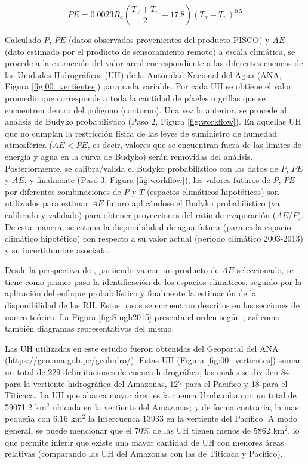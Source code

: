 \documentclass[12pt]{article}
\begin{document}
\begin{equation}
PE = 0.0023R_{a}\left ( \frac{T_{x}+T_{n}}{2} + 17.8 \right )\left ( T_{x}-T_{n} \right )^{0.5}
\end{equation}

Calculado $P$, $PE$ (datos observados provenientes del producto PISCO) y $AE$ (dato estimado por el producto de sensoramiento remoto) a escala climática, se procede a la extracción del valor areal correspondiente a las diferentes cuencas de las Unidades Hidrográficas (UH) de la Autoridad Nacional del Agua (ANA, Figura \ref{fig:00_vertientes}) para cada variable. Por cada UH se obtiene el valor promedio que corresponde a toda la cantidad de píxeles o grillas que se encuentren dentro del polígono (contorno). Una vez lo anterior, se procede al análisis de Budyko probabilístico (Paso 2, Figura \ref{fig:workflow}). En aquellas UH que no cumplan la restricción física de las leyes de suministro de humedad atmosférica ($AE < PE$, es decir, valores que se encuentran fuera de las límites de energía y agua en la curva de Budyko) serán removidas del análisis. Posteriormente, se calibra/valida el Budyko probabilístico con los datos de $P$, $PE$  y $AE$; y finalmente (Paso 3, Figura \ref{fig:workflow}), los valores futuros de $P$, $PE$ por diferentes combinaciones de $P$ y $T$ (espacios climáticos hipotéticos) son utilizados para estimar $AE$ futuro aplicándose el Budyko probabilístico (ya calibrado y validado) para obtener proyecciones del ratio de evaporación ($AE$/$P$). De esta manera, se estima la disponibilidad de agua futura (para cada espacio climático hipotético) con respecto a su valor actual (periodo climático 2003-2013) y su incertidumbre asociada.

Desde la perspectiva de \citet{Singh2015}, partiendo ya con un producto de $AE$ seleccionado, se tiene como primer paso la identificación de los espacios climáticos, seguido por la aplicación del enfoque probabilístico y finalmente la estimación de la disponibilidad de los RH. Estos pasos se encuentran descritos en las secciones de marco teórico. La Figura \ref{fig:Singh2015} presenta el orden según \citet{Singh2015}, así como también diagramas representativos del mismo.

Las UH utilizadas en este estudio fueron obtenidas del Geoportal del ANA (\url{https://geo.ana.gob.pe/geohidro/}). Estas UH (Figura \ref{fig:00_vertientes}) suman un total de 229 delimitaciones de cuenca hidrográfica, las cuales se dividen 84 para la vertiente hidrográfica del Amazonas, 127 para el Pacifico y 18 para el Titicaca. La UH que abarca mayor área es la cuenca Urubamba con un total de 59071.2 km$^{2}$ ubicada en la vertiente del Amazonas; y de forma contraria, la mas pequeña con 6.16 km$^{2}$ la Intercuenca 13933 en la vertiente del Pacífico. A modo general, se puede mencionar que el 70\% de las UH tienen menos de 5862 km$^{2}$, lo que permite inferir que existe una mayor cantidad de UH con menores áreas relativas (comparando las UH del Amazonas con las de Titicaca y Pacífico).
\end{document}
